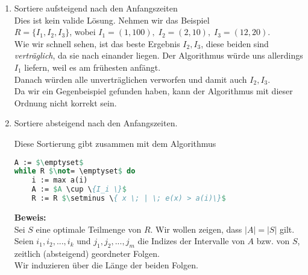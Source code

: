 \documentclass[11pt,a4paper,ngerman]{article}
\begin{document}
\begin{enumerate}[\bfseries (a)]


\item Sortiere aufsteigend nach den Anfangszeiten\\

Dies ist kein valide Lösung. Nehmen wir das Beispiel\\
$R = \{ I_1, I_2, I_3 \}$, wobei $I_1 = (1, 100), \; I_2 = (2, 10), \; I_3 = (12 , 20)$.\\

Wie wir schnell sehen, ist das beste Ergebnis $I_2, I_3$, diese beiden sind \emph{verträglich}, da sie nach einander liegen. Der Algorithmus würde uns allerdings $I_1$ liefern, weil es am frühesten anfängt.\\
Danach würden alle unverträglichen verworfen und damit auch $I_2, I_3$.\\

Da wir ein Gegenbeispiel gefunden haben, kann der Algorithmus mit dieser Ordnung nicht korrekt sein.

\item Sortiere absteigend nach den Anfangszeiten.

Diese Sortierung gibt zusammen mit dem Algorithmus
\begin{lstlisting}[language=Pascal]
A := $\emptyset$
while R $\not= \emptyset$ do
	i := max a(i)
	A := $A \cup \{I_i \}$
	R := R $\setminus \{ x \; | \; e(x) > a(i)\}$
\end{lstlisting}

\textbf{Beweis:}\\
Sei $S$ eine optimale Teilmenge von $R$. Wir wollen zeigen, dass $| A | = | S |$ gilt.\\

Seien $i_1 , i_2 , ... , i_k$ und $j_1 , j_2 , ... , j_m$ die Indizes der Intervalle von $A$ bzw. von $S$, zeitlich (absteigend) geordneter Folgen.\\

Wir induzieren über die Länge der beiden Folgen.

\end{enumerate}
\end{document}

